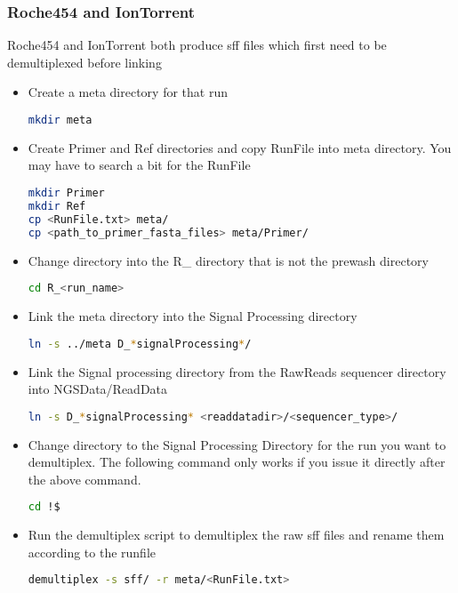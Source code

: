 \documentclass{article}
\begin{document}
\subsubsection{Roche454 and IonTorrent}
Roche454 and IonTorrent both produce sff files which first need to be demultiplexed before linking
\begin{itemize}
\item Create a meta directory for that run
{\tiny
\begin{lstlisting}[language=bash]
mkdir meta
\end{lstlisting}
}
 
\item Create Primer and Ref directories and copy RunFile into meta directory. You may have to search a bit for the RunFile
{\tiny
\begin{lstlisting}[language=bash]
mkdir Primer
mkdir Ref
cp <RunFile.txt> meta/
cp <path_to_primer_fasta_files> meta/Primer/
\end{lstlisting}
}

\item Change directory into the R\_ directory that is not the prewash directory
{\tiny
\begin{lstlisting}[language=bash]
cd R_<run_name>
\end{lstlisting}
}

\item Link the meta directory into the Signal Processing directory
{\tiny
\begin{lstlisting}[language=bash]
ln -s ../meta D_*signalProcessing*/
\end{lstlisting}
}

\item Link the Signal processing directory from the RawReads sequencer directory into NGSData/ReadData
{\tiny
\begin{lstlisting}[language=bash]
ln -s D_*signalProcessing* <readdatadir>/<sequencer_type>/
\end{lstlisting}
}

\item Change directory to the Signal Processing Directory for the run you want to demultiplex. The following command only works if you issue it directly after the above command.
{\tiny
\begin{lstlisting}[language=bash]
cd !$
\end{lstlisting}
}

\item Run the demultiplex script to demultiplex the raw sff files and rename them according to the runfile
{\tiny
\begin{lstlisting}[language=bash]
demultiplex -s sff/ -r meta/<RunFile.txt>
\end{lstlisting}
}
\end{itemize}
\end{document}
